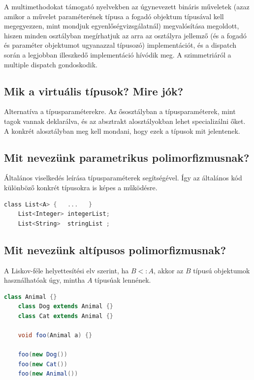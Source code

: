 	A multimethodokat támogató nyelvekben az úgynevezett bináris műveletek (azaz amikor a művelet paraméterének típusa a fogadó objektum típusával kell megegyezzen, mint mondjuk egyenlőségvizsgálatnál) megvalósítása megoldott, hiszen minden osztályban megírhatjuk az arra az osztályra jellemző (és a fogadó és paraméter objektumot ugyanazzal típusozó) implementációt, és a dispatch során a legjobban illeszkedő implementáció hívódik meg. A szimmetriáról a multiple dispatch gondoskodik.

\subsection{ Mik a virtuális típusok? Mire jók? }
	Alternatíva a típusparaméterekre. Az ősosztályban a típusparaméterek, mint tagok vannak deklarálva, és az absztrakt alosztályokban lehet specializálni őket. A konkrét alosztályban meg kell mondani, hogy ezek a típusok mit jelentenek.
	
\subsection{ Mit nevezünk parametrikus polimorfizmusnak? }
	Általános viselkedés leírása típusparaméterek segítségével. Így az általános kód különböző konkrét típusokra is képes a működésre.
	\begin{lstlisting}[language=C]
	class List<A> {   ...   }
	List<Integer> integerList;
	List<String>  stringList ;
	\end{lstlisting}
	
\subsection{ Mit nevezünk altípusos polimorfizmusnak? }
	A Liskov-féle helyettesítési elv szerint, ha $B <: A$, akkor az $B$ típusú objektumok használhatóak úgy, mintha $A$ típusúak lennének.
	\begin{lstlisting}[language=Java]
	class Animal {}
	class Dog extends Animal {}
	class Cat extends Animal {}
	
	void foo(Animal a) {}
	
	foo(new Dog())
	foo(new Cat())
	foo(new Animal())
	\end{lstlisting}
